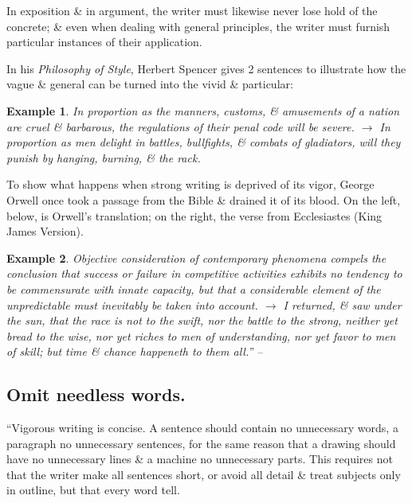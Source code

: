 \documentclass{article}
\numberwithin{equation}{section}
\newtheorem{example}{Example}[section]
\begin{document}
In exposition \&  in argument, the writer must likewise never lose hold of the concrete; \&  even when dealing with general principles, the writer must furnish particular instances of their application.

In his \textit{Philosophy of Style}, Herbert Spencer gives 2 sentences to illustrate how the vague \&  general can be turned into the vivid \&  particular:
\begin{example}
	In proportion as the manners, customs, \&  amusements of a nation are cruel \&  barbarous, the regulations of their penal code will be severe. $\to$ In proportion as men delight in battles, bullfights, \&  combats of gladiators, will they punish by hanging, burning, \&  the rack.
\end{example}
To show what happens when strong writing is deprived of its vigor, George Orwell once took a passage from the Bible \&  drained it of its blood. On the left, below, is Orwell’s translation; on the right, the verse from Ecclesiastes (King James Version).
\begin{example}
	Objective consideration of contemporary phenomena compels the conclusion that success or failure in competitive activities exhibits no tendency to be commensurate with innate capacity, but that a considerable element of the unpredictable must inevitably be taken into account. $\to$ I returned, \&  saw under the sun, that the race is not to the swift, nor the battle to the strong, neither yet bread to the wise, nor yet riches to men of understanding, nor yet favor to men of skill; but time \&  chance happeneth to them all.'' -- \cite[pp. 35--36]{Strunk_White2019}
\end{example}


\subsection{Omit needless words.}
``Vigorous writing is concise. A sentence should contain no unnecessary words, a paragraph no unnecessary sentences, for the same reason that a drawing should have no unnecessary lines \&  a machine no unnecessary parts. This requires not that the writer make all sentences short, or avoid all detail \&  treat subjects only in outline, but that every word tell.
\end{document}
